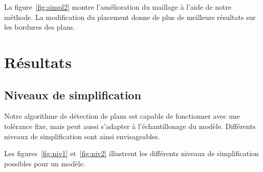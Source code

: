 ﻿\documentclass[12pt, twoside]{article}
\let\oldsection\section
\def\section{\cleardoublepage\oldsection}
\begin{document}
La figure~\ref{fig:simpl2} montre l'amélioration du maillage à l'aide de notre méthode. La modification du placement donne de plus de meilleurs résultats sur les bordures des plans.

\section{Résultats}
\subsection{Niveaux de simplification}
Notre algorithme de détection de plans est capable de fonctionner avec une tolérance fixe, mais peut aussi s'adapter à l'échantillonage du modèle. Différents niveaux de simplification sont ainsi envisageables.

Les figures~\ref{fig:niv1} et~\ref{fig:niv2} illustrent les différents niveaux de simplification possibles pour un modèle.
\end{document}
